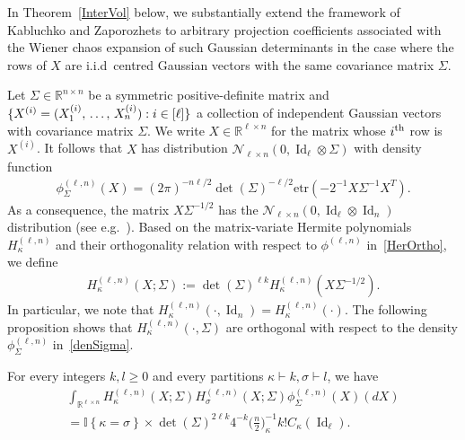 \documentclass[AHL,Unicode,longabstracts,published]{cedram}
\DeclareMathOperator{\Id}{Id}
\newcommand{\clN}{\mathcal{N}}
\newcommand{\R}{\mathbb{R}}
\newcommand{\ind}[1]{\mathbb{I}
\left\{#1\right\}}
\newcommand{\etr}[1]{\mathrm{etr}\left(#1\right)}
\begin{document}
In Theorem~\ref{InterVol} below, we substantially extend the framework of Kabluchko and Zaporozhets to arbitrary projection coefficients associated with the Wiener chaos expansion of such Gaussian determinants in the case where the rows of $X$ are i.i.d~centred Gaussian vectors with the same covariance matrix $\Sigma$.

Let $\Sigma \in \R^{n \times n}$ be a symmetric positive-definite matrix and $\{X^{(i)}=(X_1^{(i)},\,\ldots,\,X_n^{(i)})\linebreak :i \in [\ell]\}$ a collection of independent Gaussian vectors with covariance matrix $\Sigma$. We write $X \in \R^{\ell \times n}$ for the matrix whose $i^{\rm th}$ row is $X^{(i)}$. It follows that $X$ has distribution $ \clN_{\ell\times n}(0,\Id_{\ell} \otimes \Sigma)$ with density function
\begin{gather}\label{denSigma}
\phi^{(\ell,n)}_{\Sigma}(X) = (2\pi)^{-n\ell/2} \det(\Sigma)^{-\ell/2} \etr{- 2^{-1}X\Sigma^{-1}X^T}.
\end{gather}
As a consequence, the matrix $X\Sigma^{-1/2}$ has the $\clN_{\ell\times n}(0,\Id_{\ell} \otimes \Id_n)$ distribution (see e.g.~\cite[Theorem~2.3.10]{Gupta2018}). Based on the matrix-variate Hermite polynomials $H_{\kappa}^{(\ell,n)}$ and their orthogonality relation with respect to $\phi^{(\ell,n)}$ in~\eqref{HerOrtho}, we define
\begin{gather}\label{HerSigma}
H^{(\ell,n)}_{\kappa}(X; \Sigma) := \det(\Sigma)^{\ell k} H_{\kappa}^{(\ell,n)}\left(X\Sigma^{-1/2}\right).
\end{gather}
In particular, we note that $H_{\kappa}^{(\ell,n)}(\cdot, \Id_n)=H_{\kappa}^{(\ell,n)}(\cdot)$. The following proposition shows that $H^{(\ell,n)}_{\kappa}(\cdot, \Sigma)$ are orthogonal with respect to the density $\phi^{(\ell,n)}_{\Sigma}$ in~\eqref{denSigma}.

\begin{prop}\label{DefSigma}
For every integers $k,l\geq0$ and every partitions $\kappa \vdash k, \sigma \vdash l$, we have
\begin{multline*}
\int_{\R^{\ell \times n}} H^{(\ell,n)}_{\kappa}(X;\Sigma) H^{(\ell,n)}_{\sigma}(X;\Sigma) \phi^{(\ell,n)}_{\Sigma}(X)(dX)
\\
= \ind{\kappa=\sigma} \times \det(\Sigma)^{2\ell k}4^{-k}\bigg(\frac{n}{2}\bigg)_{\kappa}^{-1} k!C_{\kappa}(\Id_{\ell}).
\end{multline*}
\end{prop}
\end{document}
